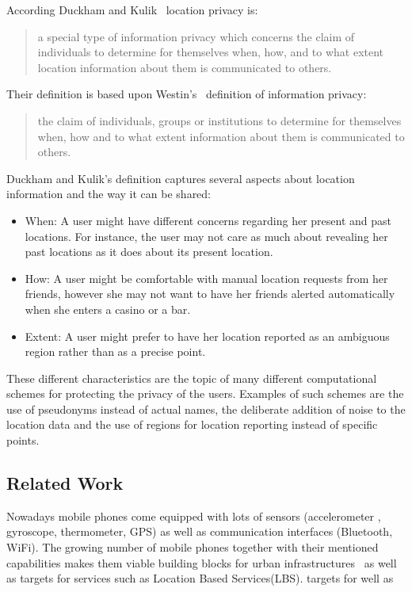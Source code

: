 According Duckham and Kulik~\cite{duckham2006location} location
privacy is:
\begin{quotation}
  a special type of information privacy which concerns the claim
  of individuals to determine for themselves when, how, and to what
  extent location information about them is communicated to others.
\end{quotation}
Their definition is based upon Westin's~\cite{westin1968privacy}
definition of information privacy:
\begin{quotation}
  the claim of individuals, groups or institutions to determine for
  themselves when, how and to what extent information about them is
  communicated to others.
\end{quotation}
Duckham and Kulik's definition captures several aspects about
location information and the way it can be shared:
\begin{itemize}
\item When: A user might have different concerns regarding her present
  and past locations. For instance, the user may not care as much
  about revealing her past locations as it does about its present
  location.
\item How: A user might be comfortable with manual location requests
  from her friends, however she may not want to have her friends
  alerted automatically when she enters a casino or a bar.  
\item Extent: A user might prefer to have her location reported as an
  ambiguous region rather than as a precise point.
\end{itemize}
These different characteristics are the topic of many different
computational schemes for protecting the privacy of the users.
Examples of such schemes are the use of pseudonyms instead of actual
names, the deliberate addition of noise to the location data and the use
of regions for location reporting instead of specific points.

\subsection{Related Work}
\label{sec:related_work}


Nowadays mobile phones come equipped with lots of sensors
(accelerometer , gyroscope, thermometer, GPS) as well as communication
interfaces (Bluetooth, WiFi). The growing number of mobile phones
together with their mentioned capabilities makes them viable building
blocks for urban infrastructures~\cite{kostakos2009understanding} as
well as targets for services such as Location Based Services(LBS).
targets for 
well as 

